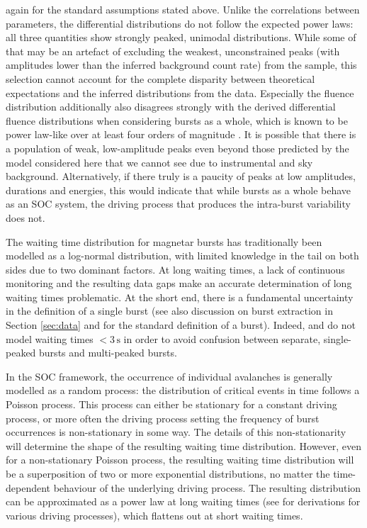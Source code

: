 \documentclass[12pt]{emulateapj}
\begin{document}
again for the standard assumptions stated above. Unlike the correlations between parameters, the differential
 distributions do not follow the expected power laws: all three quantities show strongly peaked, unimodal distributions.
 While some of that may be an artefact of excluding the weakest, unconstrained peaks (with amplitudes lower than the inferred
 background count rate) from the sample, this selection cannot account for the complete disparity between theoretical 
 expectations and the inferred distributions from the data. Especially the fluence distribution additionally also disagrees strongly
 with the derived differential fluence distributions when considering bursts as a whole, which is known to be power law-like over at least 
 four orders of magnitude \citep{gogus1999,gogus2000,prieskorn2012}.
 It is possible that there is a population of weak, low-amplitude peaks even beyond those predicted by the model considered 
 here that we cannot see due to instrumental and sky background.
Alternatively, if there truly is a paucity of peaks at low amplitudes, durations and energies, this would indicate that while bursts as a
whole behave as an SOC system, the driving process that produces the intra-burst variability does not.

The waiting time distribution for magnetar bursts has traditionally been modelled as a log-normal distribution, with limited knowledge 
in the tail on both sides due to two dominant factors. At long waiting times, a lack of continuous monitoring and the resulting data gaps
make an accurate determination of long waiting times problematic. At the short end, there is a fundamental uncertainty in the definition of 
a single burst (see also discussion on burst extraction in Section \ref{sec:data} and \citealp{vanderhorst2012} for the standard definition of a burst). 
Indeed, \citet{gogus1999}  and \citet{gogus2000} do not model waiting times $<3\,\mathrm{s}$ in order to avoid confusion between 
separate, single-peaked bursts and multi-peaked bursts. 

In the SOC framework, the occurrence of individual avalanches is generally modelled as a random process: the distribution of critical events in time
follows a Poisson process. This process can either be stationary for a constant driving process, or more often the driving process setting the frequency
of burst occurrences is non-stationary in some way. The details of this non-stationarity will determine the shape of the resulting waiting time distribution.
However, even for a non-stationary Poisson process, the resulting waiting time distribution will be a superposition of two or more exponential distributions,
no matter the time-dependent behaviour of the underlying driving process. The resulting distribution 
can be approximated as a power law at long waiting times (see \citealp{aschwanden2011} for derivations for various driving processes), which flattens out at 
short waiting times. 
\end{document}
